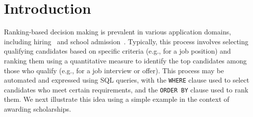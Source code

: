 \section{Introduction}
\label{sec:introduction}

Ranking-based decision making is prevalent in various application domains, including hiring~\cite{GeyikAK19} and school admission~\cite{peskun2007effectiveness}. Typically, this process involves selecting qualifying candidates based on specific criteria (e.g., for a job position) and ranking them using a quantitative measure to identify the top candidates among those who qualify (e.g., for a job interview or offer). This process may be automated and expressed using %
SQL queries, with the {\tt WHERE} clause used to select candidates who meet certain requirements, and the {\tt ORDER BY} clause used to rank them. We next illustrate this idea using a simple example in the context of awarding scholarships.


